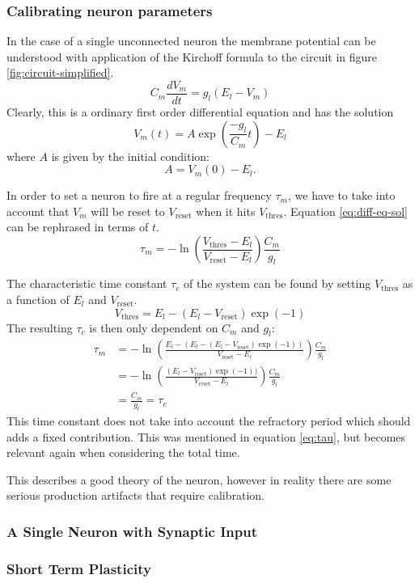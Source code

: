 \documentclass[a4paper]{article}
\begin{document}
\subsubsection{Calibrating neuron parameters}
In the case of a single unconnected neuron the membrane potential can be
understood with application of the Kirchoff formula to the circuit in figure
\ref{fig:circuit-simplified}.
\[
    C_m \frac{dV_m}{dt} = g_l(E_l - V_m)
\]
Clearly, this is a ordinary first order differential equation and has the
solution
\begin{equation}
    V_m(t) = A \exp(\frac{-g_l}{C_m}t) - E_l
    \label{eq:diff-eq-sol}
\end{equation}
where $A$ is given by the initial condition:
\[
    A = V_m(0) - E_l.
\]

In order to set a neuron to fire at a regular frequency $\tau_m$, we have to take
into account that $V_m$ will be reset to $V_\text{reset}$ when it hits
$V_\text{thres}$. Equation \eqref{eq:diff-eq-sol} can be rephrased in terms of
$t$.
\[
    \tau_m = -\ln(\frac{V_\text{thres} - E_l}{V_\text{reset} - E_l})
    \frac{C_m}{g_l}
\]

The characteristic time constant $\tau_c$ of the system can be found by setting
$V_\text{thres}$ as a function of $E_l$ and $V_\text{reset}$.
\[
    V_\text{thres} = E_l - (E_l - V_\text{reset})\exp(-1)
\]
The resulting $\tau_c$ is then only dependent on $C_m$ and $g_l$:
\begin{align*}
    \tau_m &= -\ln(\frac{E_l - (E_l - (E_l - V_\text{reset})\exp(-1))}{V_\text{reset} - E_l}) \frac{C_m}{g_l}\\
           &= -\ln(\frac{(E_l - V_\text{reset})\exp(-1))}{V_\text{reset} - E_l})\frac{C_m}{g_l} \\
           &= \frac{C_m}{g_l} = \tau_c
\end{align*}
This time constant does not take into account the refractory period which should
adds a fixed contribution. This was mentioned in equation \eqref{eq:tau}, but
becomes relevant again when considering the total time.

This describes a good theory of the neuron, however in reality there are some
serious production artifacts that require calibration.

\subsubsection{A Single Neuron with Synaptic Input}
\subsubsection{Short Term Plasticity}
\end{document}

